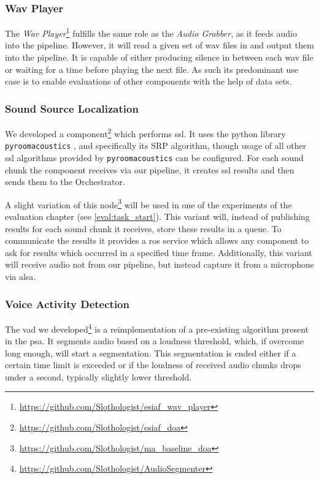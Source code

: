 \subsubsection{Wav Player}
\label{main:components:wav}
The \textit{Wav Player}\footnote{\url{https://github.com/Slothologist/esiaf_wav_player}} fulfills the same role as the \textit{Audio Grabber}, as it feeds audio into the pipeline.
However, it will read a given set of wav files in and output them into the pipeline.
It is capable of either producing silence in between each wav file or waiting for a time before playing the next file.
As such its predominant use case is to enable evaluations of other components with the help of data sets.

\subsubsection{Sound Source Localization}
\label{main:components:ssl}
We developed a component\footnote{\url{https://github.com/Slothologist/esiaf_doa}} which performs \gls{ssl}.
It uses the python library \texttt{pyroomacoustics} \cite{pyroomacoustics}, and specifically its SRP algorithm, though usage of all other \gls{ssl} algorithms provided by \texttt{pyroomacoustics} can be configured.
For each sound chunk the component receives via our pipeline, it creates \gls{ssl} results and then sends them to the Orchestrator.

A slight variation of this node\footnote{\url{https://github.com/Slothologist/ma_baseline_doa}}  will be used in one of the experiments of the evaluation chapter (see \ref{eval:task_start}).
This variant will, instead of publishing results for each sound chunk it receives, store these results in a queue.
To communicate the results it provides a \gls{ros} service which allows any component to ask for results which occurred in a specified time frame.
Additionally, this variant will receive audio not from our pipeline, but instead capture it from a microphone via \gls{alsa}.

\subsubsection{Voice Activity Detection}
\label{main:components:vad}
The \gls{vad} we developed\footnote{\url{https://github.com/Slothologist/AudioSegmenter}} is a reimplementation of a pre-existing algorithm present in the \gls{psa}.
It segments audio based on a loudness threshold, which, if overcome long enough, will start a segmentation.
This segmentation is ended either if a certain time limit is exceeded or if the loudness of received audio chunks drops under a second, typically slightly lower threshold.

